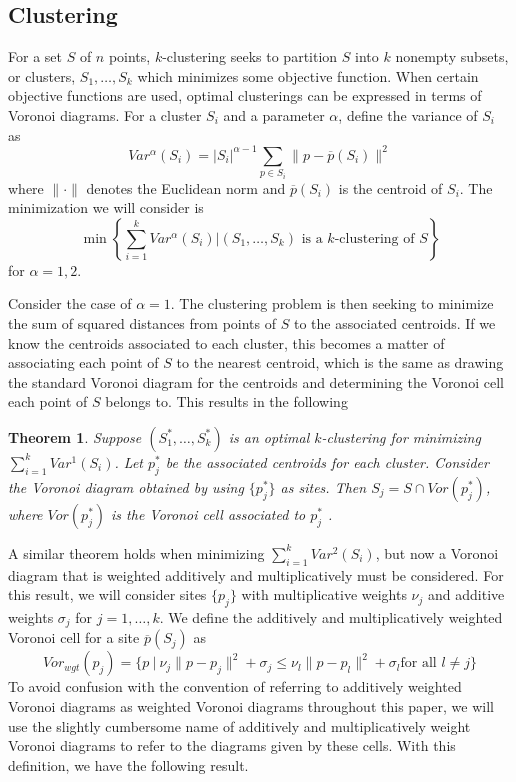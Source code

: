 \documentclass[a4paper, 11pt]{article}
\newtheorem{theorem}{Theorem}[section]
\begin{document}
\subsection{Clustering}

For a set $S$ of $n$ points, $k$-clustering seeks to partition $S$ into $k$ nonempty subsets, or clusters, $S_1, \dots, S_k$ which minimizes some objective
function. When certain objective functions are used, optimal clusterings can be expressed in terms of Voronoi diagrams. For a cluster $S_i$ and a
parameter $\alpha$, define
the variance of $S_i$ as
\begin{equation}
  Var^\alpha(S_i) = |S_i|^{\alpha-1} \sum_{p \in S_i} \| p - \overline{p}(S_i) \|^2
  \label{def:var}
\end{equation}
where $\| \cdot \|$ denotes the Euclidean norm and $\overline{p}(S_i)$ is the centroid of $S_i$. The minimization we will consider is
\begin{equation}
  \min \left\{ \sum_{i=1}^k Var^\alpha (S_i) | (S_1,\dots, S_k) \text{ is a $k$-clustering of } S \right\}
  \label{eq:cluster}
\end{equation}
for $\alpha = 1,2$.

Consider the case of $\alpha = 1$. The clustering problem is then seeking to minimize the sum of squared distances from points of $S$ to the
associated centroids. If we know the centroids associated to each cluster, this becomes a matter of associating each point of $S$ to the nearest
centroid, which is the same as drawing the standard Voronoi diagram for the centroids and determining the Voronoi cell each point of $S$ belongs to.
This results in the following

\begin{theorem}
  \label{thm:var_1}
  Suppose $(S_1^\ast, \dots, S_k^\ast)$ is an optimal $k$-clustering for minimizing $\sum_{i=1}^k Var^1(S_i)$. Let $p_j^\ast$ be the associated
  centroids for each cluster. Consider the Voronoi diagram obtained by using $\{ p_j^\ast \}$ as sites. Then $S_j = S \cap Vor(p_j^\ast)$, where
  $Vor(p_j^\ast)$ is the Voronoi cell associated to $p_j^\ast$ \cite{inaba_clustering} .
\end{theorem}

A similar theorem holds when minimizing $\sum_{i=1}^k Var^2(S_i)$, but now a Voronoi diagram that is weighted additively and multiplicatively must be
considered. For this result, we will consider sites $\{ p_j \}$ with multiplicative weights $\nu_j$ and additive
weights $\sigma_j$ for $j=1,\dots, k$. We define the additively and multiplicatively weighted Voronoi cell for a site $\overline{p}(S_j)$ as
\begin{equation}
  Vor_{wgt}( p_j ) = \{ p \ | \ \nu_j \| p - p_j \|^2 + \sigma_j \leq \nu_l \| p - p_l \|^2 + \sigma_l \text{
    for all $l \neq j$} \}
  \label{def:wgt_vor}
\end{equation}
To avoid confusion with the convention of referring to additively weighted Voronoi diagrams as weighted Voronoi diagrams throughout this paper, we
will use the slightly cumbersome name of additively and multiplicatively weight Voronoi diagrams to refer to the diagrams given by these cells. With
this definition, we have the following result.
\end{document}
